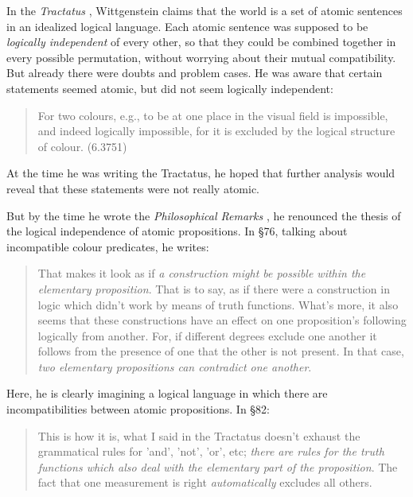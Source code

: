 \NI In the \emph{Tractatus} \cite{wittgenstein-tractatus}, Wittgenstein
claims that the world is a set of atomic sentences in an idealized
logical language.  Each atomic sentence was supposed to be
\emph{logically independent} of every other, so that they could be
combined together in every possible permutation, without worrying
about their mutual compatibility.
But already there were doubts and problem cases.  He was aware that
certain  statements seemed atomic, but did not seem logically
independent:

\begin{quote}
  For two colours, e.g., to be at one place in the visual field is
  impossible, and indeed logically impossible, for it is excluded by
  the logical structure of colour. (6.3751)
\end{quote}

\NI At the time he was writing the Tractatus, he hoped that further
analysis would reveal that these statements were not really atomic.

But by the time he wrote the \emph{Philosophical Remarks} \cite{wittgenstein-remarks}, he
renounced the thesis of the logical independence of atomic
propositions.  In \S 76, talking about incompatible colour predicates,
he writes:

\begin{quote}
  That makes it look as if \emph{a construction might be possible
    within the elementary proposition}. That is to say, as if there
  were a construction in logic which didn't work by means of truth
  functions.  What's more, it also seems that these constructions have
  an effect on one proposition's following logically from another.
  For, if different degrees exclude one another it follows from the
  presence of one that the other is not present.  In that case,
  \emph{two elementary propositions can contradict one another}.
\end{quote}

\NI Here, he is clearly imagining a logical language in which there
are incompatibilities between atomic propositions. In \S 82:

\begin{quote}
  This is how it is, what I said in the Tractatus doesn't exhaust the
  grammatical rules for 'and', 'not', 'or', etc; \emph{there are rules
    for the truth functions which also deal with the elementary part
    of the proposition}.  The fact that one measurement is right
  \emph{automatically} excludes all others.
\end{quote}

